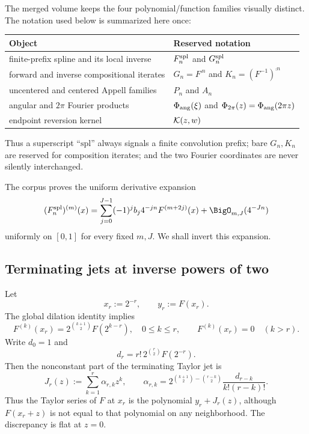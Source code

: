 The merged volume keeps the four polynomial/function families visually
distinct.  The notation used below is summarized here once:
\begin{center}
\begin{tabular}{@{}ll@{}}
\toprule
Object & Reserved notation \\
\midrule
finite-prefix spline and its local inverse
  & $F_{n}^{\mathrm{spl}}$ and $G_{n}^{\mathrm{spl}}$ \\
forward and inverse compositional iterates
  & $G_n=F^{\comp n}$ and $K_n=(F^{-1})^{\comp n}$ \\
uncentered and centered Appell families
  & $P_n$ and $A_n$ \\
angular and $2\pi$ Fourier products
  & $\Phi_{\mathrm{ang}}(\xi)$ and $\Phi_{2\pi}(z)=\Phi_{\mathrm{ang}}(2\pi z)$ \\
endpoint reversion kernel
  & $\mathcal K(z,w)$ \\
\bottomrule
\end{tabular}
\end{center}
Thus a superscript ``$\mathrm{spl}$'' always signals a finite convolution
prefix; bare $G_n,K_n$ are reserved for composition iterates; and the two
Fourier coordinates are never silently interchanged.

The corpus proves the uniform derivative expansion
\begin{equation}
 (\Fn)^{(m)}(x)=
 \sum_{j=0}^{J-1}(-1)^jb_j4^{-jn}F^{(m+2j)}(x)
 +\BigO_{m,J}(4^{-Jn})
 \label{is:p1:eq:forward-prefix-expansion}
\end{equation}
uniformly on $[0,1]$ for every fixed $m,J$.  We shall invert this expansion.

\subsection{Terminating jets at inverse powers of two}

Let
\begin{equation}
 x_r:=2^{-r},\qquad y_r:=F(x_r).
 \label{is:p1:eq:xr-yr}
\end{equation}
The global dilation identity implies
\begin{equation}
 F^{(k)}(x_r)=2^{\binom{k+1}{2}}F(2^{k-r}),
 \quad 0\le k\le r,
 \qquad
 F^{(k)}(x_r)=0\quad(k>r).
 \label{is:p1:eq:dyadic-jet}
\end{equation}
Write $d_0=1$ and
\begin{equation}
 d_r=r!\,2^{\binom r2}F(2^{-r}).
 \label{is:p1:eq:d-def}
\end{equation}
Then the nonconstant part of the terminating Taylor jet is
\begin{equation}
 J_r(z):=\sum_{k=1}^{r}\alpha_{r,k}z^k,
 \qquad
 \alpha_{r,k}
 =2^{\binom{k+1}{2}-\binom{r-k}{2}}
 \frac{d_{r-k}}{k!(r-k)!}.
 \label{is:p1:eq:Jr}
\end{equation}
Thus the Taylor series of $F$ at $x_r$ is the polynomial $y_r+J_r(z)$, although
$F(x_r+z)$ is not equal to that polynomial on any neighborhood.  The discrepancy is flat
at $z=0$.

